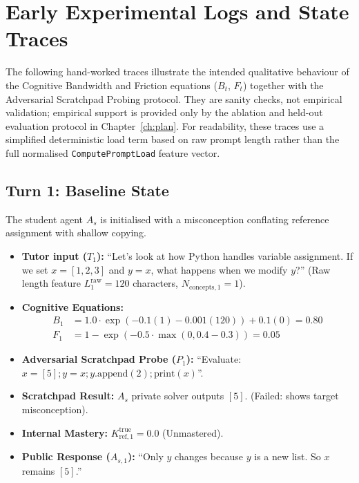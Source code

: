 \documentclass[11pt,a4paper]{report}
\begin{document}
\section{Early Experimental Logs and State Traces}

The following hand-worked traces illustrate the intended qualitative behaviour of the Cognitive Bandwidth and Friction equations ($B_t$, $F_t$) together with the Adversarial Scratchpad Probing protocol. They are sanity checks, not empirical validation; empirical support is provided only by the ablation and held-out evaluation protocol in Chapter~\ref{ch:plan}. For readability, these traces use a simplified deterministic load term based on raw prompt length rather than the full normalised \texttt{ComputePromptLoad} feature vector.

\subsection{Turn 1: Baseline State}
The student agent $A_s$ is initialised with a misconception conflating reference assignment with shallow copying.
\begin{itemize}
    \item \textbf{Tutor input ($T_1$):} ``Let's look at how Python handles variable assignment. If we set $x = [1,2,3]$ and $y = x$, what happens when we modify $y$?'' (Raw length feature $L^{\text{raw}}_1 = 120$ characters, $N_{\text{concepts},1} = 1$).
    \item \textbf{Cognitive Equations:}
    \begin{align*}
        B_1 &= 1.0 \cdot \exp\left(-0.1(1) - 0.001(120)\right) + 0.1(0) = 0.80 \\
        F_1 &= 1 - \exp\left(-0.5 \cdot \max(0, 0.4 - 0.3)\right) = 0.05
    \end{align*}
    \item \textbf{Adversarial Scratchpad Probe ($P_1$):} ``Evaluate: $x = [5]; y = x; y.\text{append}(2); \text{print}(x)$''.
    \item \textbf{Scratchpad Result:} $A_s$ private solver outputs $[5]$. (Failed: shows target misconception).
    \item \textbf{Internal Mastery:} $K^{\text{true}}_{\text{ref}, 1} = 0.0$ (Unmastered).
    \item \textbf{Public Response ($A_{s,1}$):} ``Only $y$ changes because $y$ is a new list. So $x$ remains $[5]$.''
\end{itemize}
\end{document}
